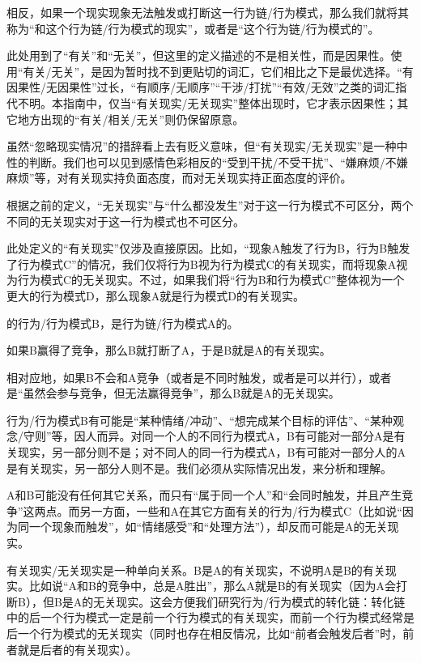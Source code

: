 相反，如果一个现实现象无法触发或打断这一行为链/行为模式，那么我们就将其称为“和这个行为链/行为模式的现实”，或者是“这个行为链/行为模式的”。
\begin{explain}
此处用到了“有关”和“无关”，但这里的定义描述的不是相关性，而是因果性。使用“有关/无关”，是因为暂时找不到更贴切的词汇，它们相比之下是最优选择。“有因果性/无因果性”过长，“有顺序/无顺序”“干涉/打扰”“有效/无效”之类的词汇指代不明。本指南中，仅当“有关现实/无关现实”整体出现时，它才表示因果性；其它地方出现的“有关/相关/无关”则仍保留原意。

虽然“忽略现实情况”的措辞看上去有贬义意味，但“有关现实/无关现实”是一种中性的判断。我们也可以见到感情色彩相反的“受到干扰/不受干扰”、“嫌麻烦/不嫌麻烦”等，对有关现实持负面态度，而对无关现实持正面态度的评价。

根据之前的定义，“无关现实”与“什么都没发生”对于这一行为模式不可区分，两个不同的无关现实对于这一行为模式也不可区分。

此处定义的“有关现实”仅涉及直接原因。比如，“现象A触发了行为B，行为B触发了行为模式C”的情况，我们仅将行为B视为行为模式C的有关现实，而将现象A视为行为模式C的无关现实。不过，如果我们将“行为B和行为模式C”整体视为一个更大的行为模式D，那么现象A就是行为模式D的有关现实。
\end{explain}
的行为/行为模式B，是行为链/行为模式A的。
\begin{explain}
如果B赢得了竞争，那么B就打断了A，于是B就是A的有关现实。

相对应地，如果B不会和A竞争（或者是不同时触发，或者是可以并行），或者是“虽然会参与竞争，但无法赢得竞争”，那么B就是A的无关现实。

行为/行为模式B有可能是“某种情绪/冲动”、“想完成某个目标的评估”、“某种观念/守则”等，因人而异。对同一个人的不同行为模式A，B有可能对一部分A是有关现实，另一部分则不是；对不同人的同一行为模式A，B有可能对一部分人的A是有关现实，另一部分人则不是。我们必须从实际情况出发，来分析和理解。

A和B可能没有任何其它关系，而只有“属于同一个人”和“会同时触发，并且产生竞争”这两点。而另一方面，一些和A在其它方面有关的行为/行为模式C（比如说“因为同一个现象而触发”，如“情绪感受”和“处理方法”），却反而可能是A的无关现实。

有关现实/无关现实是一种单向关系。B是A的有关现实，不说明A是B的有关现实。比如说“A和B的竞争中，总是A胜出”，那么A就是B的有关现实（因为A会打断B），但B是A的无关现实。这会方便我们研究行为/行为模式的转化链：转化链中的后一个行为模式一定是前一个行为模式的有关现实，而前一个行为模式经常是后一个行为模式的无关现实（同时也存在相反情况，比如“前者会触发后者”时，前者就是后者的有关现实）。
\end{explain}

